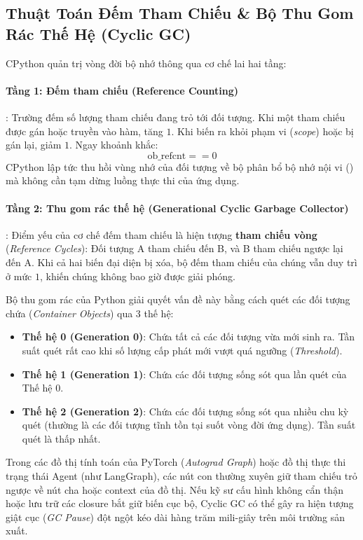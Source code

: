 \subsection{Thuật Toán Đếm Tham Chiếu \& Bộ Thu Gom Rác Thế Hệ (Cyclic GC)}

CPython quản trị vòng đời bộ nhớ thông qua cơ chế lai hai tầng:

\paragraph{Tầng 1: Đếm tham chiếu (Reference Counting)}:
Trường  đếm số lượng tham chiếu đang trỏ tới đối tượng. Khi một tham chiếu được gán hoặc truyền vào hàm,  tăng $1$. Khi biến ra khỏi phạm vi (\textit{scope}) hoặc bị gán lại,  giảm $1$. Ngay khoảnh khắc:
\begin{equation}
\text{ob\_refcnt} == 0
\end{equation}
CPython lập tức thu hồi vùng nhớ của đối tượng về bộ phân bổ bộ nhớ nội vi () mà không cần tạm dừng luồng thực thi của ứng dụng.

\paragraph{Tầng 2: Thu gom rác thế hệ (Generational Cyclic Garbage Collector)}:
Điểm yếu của cơ chế đếm tham chiếu là hiện tượng \textbf{tham chiếu vòng} (\textit{Reference Cycles}): Đối tượng A tham chiếu đến B, và B tham chiếu ngược lại đến A. Khi cả hai biến đại diện bị xóa, bộ đếm tham chiếu của chúng vẫn duy trì ở mức $1$, khiến chúng không bao giờ được giải phóng.

Bộ thu gom rác của Python giải quyết vấn đề này bằng cách quét các đối tượng chứa (\textit{Container Objects}) qua 3 thế hệ:
\begin{itemize}
  \item \textbf{Thế hệ 0 (Generation 0)}: Chứa tất cả các đối tượng vừa mới sinh ra. Tần suất quét rất cao khi số lượng cấp phát mới vượt quá ngưỡng (\textit{Threshold}).
  \item \textbf{Thế hệ 1 (Generation 1)}: Chứa các đối tượng sống sót qua lần quét của Thế hệ 0.
  \item \textbf{Thế hệ 2 (Generation 2)}: Chứa các đối tượng sống sót qua nhiều chu kỳ quét (thường là các đối tượng tĩnh tồn tại suốt vòng đời ứng dụng). Tần suất quét là thấp nhất.
\end{itemize}

Trong các đồ thị tính toán của PyTorch (\textit{Autograd Graph}) hoặc đồ thị thực thi trạng thái Agent (như LangGraph), các nút con thường xuyên giữ tham chiếu trỏ ngược về nút cha hoặc context của đồ thị. Nếu kỹ sư cấu hình không cẩn thận hoặc lưu trữ các closure bắt giữ biến cục bộ, Cyclic GC có thể gây ra hiện tượng giật cục (\textit{GC Pause}) đột ngột kéo dài hàng trăm mili-giây trên môi trường sản xuất.

